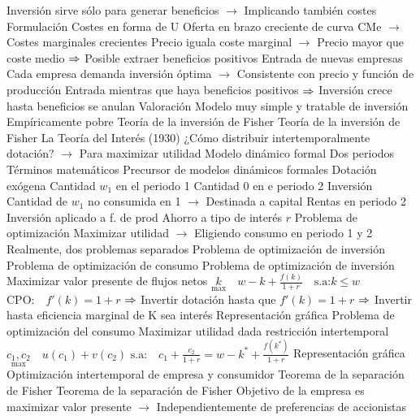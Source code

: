 \documentclass{nuevotema}
\begin{document}
\begin{esquemal}
				\4[] Inversión sirve sólo para generar beneficios
				\4[] $\to$ Implicando también costes
			\3 Formulación
				\4 Costes en forma de U
				\4 Oferta en brazo creciente de curva CMe
				\4[] $\to$ Costes marginales crecientes
				\4 Precio iguala coste marginal
				\4[] $\to$ Precio mayor que coste medio
				\4[] $\then$ Posible extraer beneficios positivos
				\4 Entrada de nuevas empresas
				\4[] Cada empresa demanda inversión óptima
				\4[] $\to$ Consistente con precio y función de producción
				\4[] Entrada mientras que haya beneficios positivos
				\4[] $\then$ Inversión crece hasta beneficios se anulan
			\3 Valoración
				\4 Modelo muy simple y tratable de inversión
				\4 Empíricamente pobre
		\2 Teoría de la inversión de Fisher
			\3 Teoría de la inversión de Fisher
				\4 La Teoría del Interés (1930)
				\4 ¿Cómo distribuir intertemporalmente dotación?
				\4[] $\to$ Para maximizar utilidad
				\4 Modelo dinámico formal
				\4[] Dos periodos
				\4[] Términos matemáticos
				\4 Precursor de modelos dinámicos formales
				\4 Dotación exógena
				\4[] Cantidad $w_1$ en el periodo 1
				\4[] Cantidad 0 en e periodo 2
				\4 Inversión
				\4[] Cantidad de $w_1$ no consumida en 1
				\4[] $\to$ Destinada a capital
				\4 Rentas en periodo 2
				\4[] Inversión aplicado a f. de prod
				\4[] Ahorro a tipo de interés $r$
				\4 Problema de optimización
				\4[] Maximizar utilidad
				\4[] $\to$ Eligiendo consumo en periodo 1 y 2
				\4 Realmente, dos problemas separados
				\4[I] Problema de optimización de inversión
				\4[II] Problema de optimización de consumo
				\4 Problema de optimización de inversión
				\4[] Maximizar valor presente de flujos netos
				\4[] $\underset{\max}{k} \quad w-k + \frac{f(k)}{1+r} \quad \text{s.a:} k \leq w$
				\4[] $\text{CPO:} \quad f'(k) = 1+r$
				\4[] $\then$ Invertir dotación hasta que $f'(k) = 1+r$
				\4[] $\then$ Invertir hasta eficiencia marginal de K sea interés
				\4[] Representación gráfica
				\4[] 
				\4 Problema de optimización del consumo
				\4[] Maximizar utilidad dada restricción intertemporal
				\4[] $\underset{\max}{c_1, c_2} \quad u(c_1) + v(c_2)$
				\4[] $\text{s.a:} \quad c_1 + \frac{c_2}{1+r} = w -k^* + \frac{f(k^*)}{1+r}$
				\4[] Representación gráfica
				\4[] 
				\4 Optimización intertemporal de empresa y consumidor
				\4[$\then$] Teorema de la separación de Fisher
			\3 Teorema de la separación de Fisher
				\4 Objetivo de la empresa es maximizar valor presente
				\4[] $\to$ Independientemente de preferencias de accionistas

\end{esquemal}
\end{document}
